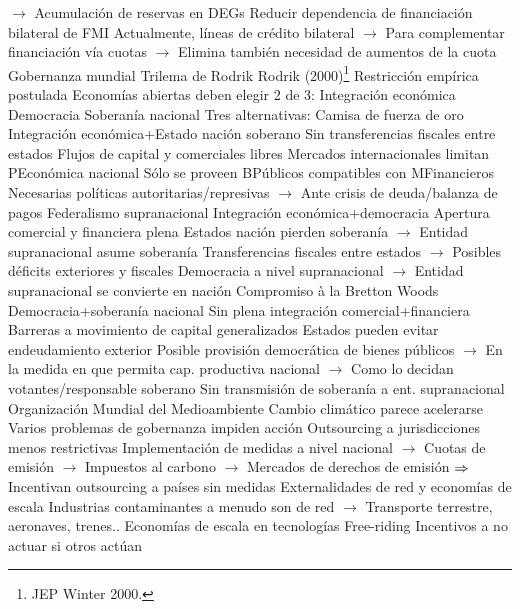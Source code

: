 \documentclass{nuevotema}
\begin{document}
\begin{esquemal}
				\4[] $\to$ Acumulación de reservas en DEGs
				\4 Reducir dependencia de financiación bilateral de FMI
				\4[] Actualmente, líneas de crédito bilateral
				\4[] $\to$ Para complementar financiación vía cuotas
				\4[] $\to$ Elimina también necesidad de aumentos de la cuota
		\2 Gobernanza mundial
			\3 Trilema de Rodrik
				\4 Rodrik (2000)\footnote{JEP Winter 2000.}
				\4 Restricción empírica postulada
				\4 Economías abiertas deben elegir 2 de 3:
				\4[I] Integración económica
				\4[II] Democracia
				\4[III] Soberanía nacional
				\4 Tres alternativas:
				\4[A] Camisa de fuerza de oro
				\4[] Integración económica+Estado nación soberano
				\4[] Sin transferencias fiscales entre estados
				\4[] Flujos de capital y comerciales libres
				\4[] Mercados internacionales limitan PEconómica nacional
				\4[] Sólo se proveen BPúblicos compatibles con MFinancieros
				\4[] Necesarias políticas autoritarias/represivas
				\4[] $\to$ Ante crisis de deuda/balanza de pagos
				\4[B] Federalismo supranacional
				\4[] Integración económica+democracia
				\4[] Apertura comercial y financiera plena
				\4[] Estados nación pierden soberanía
				\4[] $\to$ Entidad supranacional asume soberanía
				\4[] Transferencias fiscales entre estados
				\4[] $\to$ Posibles déficits exteriores y fiscales
				\4[] Democracia a nivel supranacional
				\4[] $\to$ Entidad supranacional se convierte en nación
				\4[C] Compromiso à la Bretton Woods
				\4[] Democracia+soberanía nacional
				\4[] Sin plena integración comercial+financiera
				\4[] Barreras a movimiento de capital generalizados
				\4[] Estados pueden evitar endeudamiento exterior
				\4[] Posible provisión democrática de bienes públicos
				\4[] $\to$ En la medida en que permita cap. productiva nacional
				\4[] $\to$ Como lo decidan votantes/responsable soberano
				\4[] Sin transmisión de soberanía a ent. supranacional
			\3 Organización Mundial del Medioambiente
				\4 Cambio climático parece acelerarse
				\4 Varios problemas de gobernanza impiden acción
				\4[I] Outsourcing a jurisdicciones menos restrictivas
				\4[] Implementación de medidas a nivel nacional
				\4[] $\to$ Cuotas de emisión
				\4[] $\to$ Impuestos al carbono
				\4[] $\to$ Mercados de derechos de emisión
				\4[] $\Rightarrow$ Incentivan outsourcing a países sin medidas
				\4[II] Externalidades de red y economías de escala
				\4[] Industrias contaminantes a menudo son de red
				\4[] $\to$ Transporte terrestre, aeronaves, trenes..
				\4[] Economías de escala en tecnologías
				\4[III] Free-riding
				\4[] Incentivos a no actuar si otros actúan

\end{esquemal}
\end{document}
